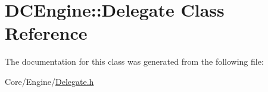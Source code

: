 \hypertarget{classDCEngine_1_1Delegate}{\section{D\-C\-Engine\-:\-:Delegate Class Reference}
\label{classDCEngine_1_1Delegate}
}


The documentation for this class was generated from the following file\-:\begin{DoxyCompactItemize}
\item 
Core/\-Engine/\hyperlink{Delegate_8h}{Delegate.\-h}\end{DoxyCompactItemize}
